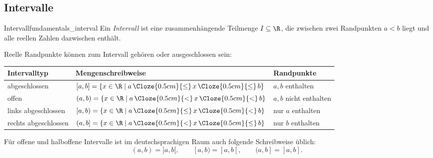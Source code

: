 \subsection{Intervalle}
\label{subsec:fundamentals_intervals}

\begin{DefinitionBox}{Intervall}{fundamentals_interval}
  Ein \emph{Intervall}  ist eine zusammenhängende
  Teilmenge $I\subseteq\R$, die zwischen zwei Randpunkten $a<b$ liegt und alle
  reellen Zahlen dazwischen enthält.

  \begin{center}
  \end{center}
\end{DefinitionBox}

Reelle Randpunkte können zum Intervall gehören oder ausgeschlossen sein:\par

\renewcommand{\arraystretch}{1.35}
\begin{tabularx}{\linewidth}{@{}l >{\centering\arraybackslash}X l@{}}
  \toprule
  \textbf{Intervalltyp} & \textbf{Mengenschreibweise} & \textbf{Randpunkte} \\
  \midrule
  abgeschlossen
    & $[a,b]=\{x\in\R\mid a\,\Cloze{0.5cm}{\leq}\,x\,\Cloze{0.5cm}{\leq}\,b\}$
    & $a,b$ enthalten \\
  offen
    & $(a,b)=\{x\in\R\mid a\,\Cloze{0.5cm}{<}\,x\,\Cloze{0.5cm}{<}\,b\}$
    & $a,b$ nicht enthalten \\
  links abgeschlossen
    & $[a,b)=\{x\in\R\mid a\,\Cloze{0.5cm}{\leq}\,x\,\Cloze{0.5cm}{<}\,b\}$
    & nur $a$ enthalten \\
  rechts abgeschlossen
    & $(a,b]=\{x\in\R\mid a\,\Cloze{0.5cm}{<}\,x\,\Cloze{0.5cm}{\leq}\,b\}$
    & nur $b$ enthalten \\
  \bottomrule
\end{tabularx}
\renewcommand{\arraystretch}{1}

\begin{RemarkBox}
  Für offene und halboffene Intervalle ist im deutschsprachigen Raum auch
  folgende Schreibweise üblich:
  \[
    (a,b)=]a,b[,
    \qquad
    [a,b)=[a,b[,
    \qquad
    (a,b]=]a,b].
  \]
\end{RemarkBox}


